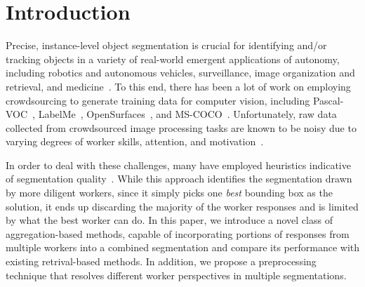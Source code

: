 \section{Introduction\label{sec:intro}}
Precise, instance-level object segmentation is crucial for identifying and/or tracking objects in a variety of real-world emergent applications of autonomy, including robotics and autonomous vehicles, surveillance, image organization and retrieval, and medicine~\cite{Irshad2014,Yamaguchi2012}. To this end, there has been a lot of work on employing crowdsourcing to generate training data for computer vision, including Pascal-VOC~\cite{Everingham15}, LabelMe~\cite{Torralba2010}, OpenSurfaces~\cite{bell15minc}, and MS-COCO~\cite{Lin2012}. Unfortunately, raw data collected from crowdsourced image processing tasks are known to be noisy due to varying degrees of worker skills, attention, and motivation~\cite{bell14intrinsic,MDWWelinder2010}. 
\par In order to deal with these challenges, many have employed heuristics indicative of segmentation quality~\cite{Cabezas2015,Sameki2015,Sorokin2008}. While this approach identifies the segmentation drawn by more diligent workers, since it simply picks one \textit{best} bounding box as the solution, it ends up discarding the majority of the worker responses and is limited by what the best worker can do. In this paper, we introduce a novel class of aggregation-based methods, capable of incorporating portions of responses from multiple workers into a combined segmentation and compare its performance with existing retrival-based methods. In addition, we propose a preprocessing technique that resolves different worker perspectives in multiple segmentations.